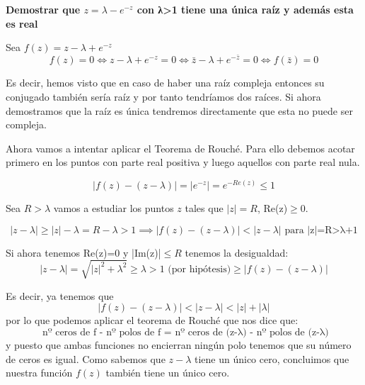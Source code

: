 \documentclass{apuntes}
\begin{document}
\begin{example}
\textbf{Demostrar que $z=λ-e^{-z}$ con λ>1 tiene una única raíz y además esta es real}

Sea $f(z)=z-λ+e^{-z}$
\[f(z)=0 \iff z-λ+e^{-z} = 0 \iff \bar{z}-λ+e^{-\bar{z}}=0 \iff f(\bar{z})=0\]

Es decir, hemos visto que en caso de haber una raíz compleja entonces su conjugado también sería raíz y por tanto tendríamos dos raíces. Si ahora demostramos que la raíz es única tendremos directamente que esta no puede ser compleja.

Ahora vamos a intentar aplicar el Teorema de Rouché. Para ello debemos acotar primero en los puntos con parte real positiva y luego aquellos con parte real nula.

\[|f(z)-(z-λ)|=|e^{-z}|=e^{-Re(z)} \leq 1\]

Sea $R>λ$ vamos a estudiar los puntos $z$ tales que $|z|=R$, Re(z)$\geq 0$.

\[|z-λ|\geq |z|-λ = R - λ > 1 \implies |f(z)-(z-λ)| < |z-λ| \text{ para |z|=R>λ+1}\]

Si ahora tenemos Re(z)=0 y |Im(z)|$\leq R$ tenemos la desigualdad:
\[|z-λ| = \sqrt{|z|^2+λ^2}\geq λ > 1 \text{ (por hipótesis)} \geq |f(z)-(z-λ)|\]

Es decir, ya tenemos que
\[|f(z)-(z-λ)|<|z-λ|<|z|+|λ|\]
por lo que podemos aplicar el teorema de Rouché que nos dice que:
\[\text{ nº ceros de  f - nº polos de f = nº ceros de (z-λ) - nº polos de (z-λ)}\]
y puesto que ambas funciones no encierran ningún polo tenemos que su número de ceros es igual. Como sabemos que $z-λ$ tiene un único cero, concluimos que nuestra función $f(z)$ también tiene un único cero.
\end{example}
\end{document}
